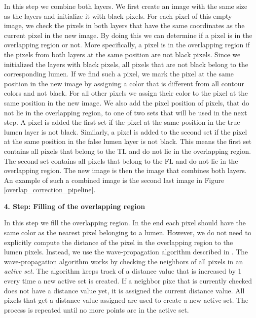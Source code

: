 \documentclass[thesis.tex]{subfiles}
\begin{document}
In this step we combine both layers. We first create an image with the same size as the layers and initialize it with black pixels. For each pixel of this empty image, we check the pixels in both layers that have the same coordinates as the current pixel in the new image. By doing this we can determine if a pixel is in the overlapping region or not. More specifically, a pixel is in the overlapping region if the pixels from both layers at the same position are not black pixels. Since we initialized the layers with black pixels, all pixels that are not black belong to the corresponding lumen. If we find such a pixel, we mark the pixel at the same position in the new image by assigning a color that is different from all contour colors and not black. For all other pixels we assign their color to the pixel at the same position in the new image. We also add the pixel position of pixels, that do not lie in the overlapping region, to one of two sets that will be used in the next step. A pixel is added the first set if the pixel at the same position in the true lumen layer is not black. Similarly, a pixel is added to the second set if the pixel at the same position in the false lumen layer is not black. This means the first set contains all pixels that belong to the TL and do not lie in the overlapping region. The second set contains all pixels that belong to the FL and do not lie in the overlapping region. The new image is then the image that combines both layers. An example of such a combined image is the second last image in Figure \ref{overlap_correction_pipeline}.

\textbf{4. Step: Filling of the overlapping region}

In this step we fill the overlapping region. In the end each pixel should have the same color as the nearest pixel belonging to a lumen. However, we do not need to explicitly compute the distance of the pixel in the overlapping region to the lumen pixels. Instead, we use the wave-propagation algorithm described in \cite{porikli2007fast}. The wave-propagation algorithm works by checking the neighbors of all pixels in an \textit{active set}. The algorithm keeps track of a distance value that is increased by 1 every time a new active set is created. If a neighbor pixe that is currently checked does not have a distance value yet, it is assigned the current distance value. All pixels that get a distance value assigned are used to create a new active set. The process is repeated until no more points are in the active set.
\end{document}
